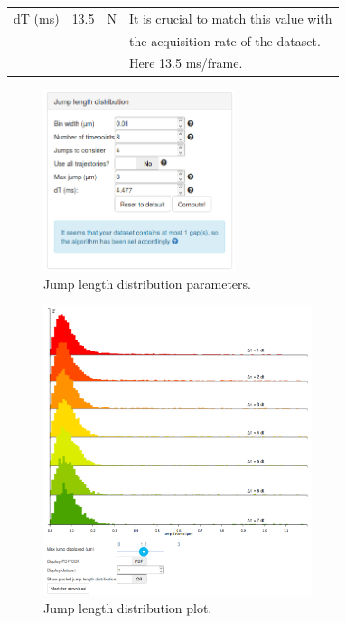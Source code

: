 \begin{center}
\begin{tabular}{lrll}
  dT (ms) & 13.5 & N & It is crucial to match this value with \\&&&the acquisition rate of the dataset. \\&&&Here 13.5 ms/frame.\\
\end{tabular}
\end{center}

\begin{figure}[h!]
\centering
\includegraphics[width=0.5\textwidth]{../SPTGUI/static/SPTGUI/img/tutorial/0.7/tuto6.png}
\caption{\label{fig:tuto6}Jump length distribution parameters.}
\end{figure}


\begin{figure}[h!]
\centering
\includegraphics[width=0.7\textwidth]{../SPTGUI/static/SPTGUI/img/tutorial/0.7/tuto7.png}
\caption{\label{fig:tuto7}Jump length distribution plot.}
\end{figure}

